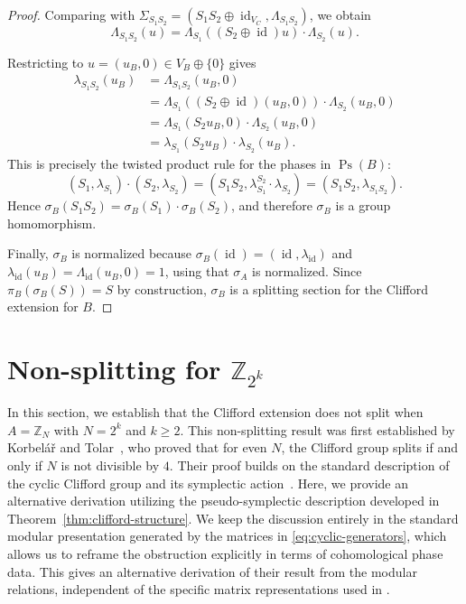 \documentclass[11pt, reqno]{amsart}
\theoremstyle{definition}
\theoremstyle{remark}
\newcommand{\Z}{\mathbb{Z}}
\DeclareMathOperator{\Ps}{Ps}
\DeclareMathOperator{\id}{id}
\begin{document}
\begin{proof}
Comparing with $\Sigma_{S_1 S_2} = (S_1 S_2 \oplus \id_{V_C}, \Lambda_{S_1 S_2})$, we obtain
\begin{equation}
\Lambda_{S_1 S_2}(u) = \Lambda_{S_1}((S_2 \oplus \id)u) \cdot \Lambda_{S_2}(u).
\end{equation}

Restricting to $u = (u_B, 0) \in V_B \oplus \{0\}$ gives
\begin{align}
\lambda_{S_1 S_2}(u_B) &= \Lambda_{S_1 S_2}(u_B, 0) \nonumber \\
&= \Lambda_{S_1}((S_2 \oplus \id)(u_B, 0)) \cdot \Lambda_{S_2}(u_B, 0) \nonumber \\
&= \Lambda_{S_1}(S_2 u_B, 0) \cdot \Lambda_{S_2}(u_B, 0) \nonumber \\
&= \lambda_{S_1}(S_2 u_B) \cdot \lambda_{S_2}(u_B).
\end{align}
This is precisely the twisted product rule for the phases in $\Ps(B)$:
\begin{equation}
(S_1, \lambda_{S_1}) \cdot (S_2, \lambda_{S_2}) = (S_1 S_2, \lambda_{S_1}^{S_2} \cdot \lambda_{S_2}) = (S_1 S_2, \lambda_{S_1 S_2}).
\end{equation}
Hence $\sigma_B(S_1 S_2) = \sigma_B(S_1) \cdot \sigma_B(S_2)$, and therefore $\sigma_B$ is a group homomorphism.

Finally, $\sigma_B$ is normalized because $\sigma_B(\id) = (\id, \lambda_{\id})$ and $\lambda_{\id}(u_B) = \Lambda_{\id}(u_B, 0) = 1$, using that $\sigma_A$ is normalized. Since $\pi_B(\sigma_B(S)) = S$ by construction, $\sigma_B$ is a splitting section for the Clifford extension for $B$.
\end{proof}

\section{Non-splitting for \texorpdfstring{$\Z_{2^k}$}{Z\_2\^k}}\label{sec:nonsplit-cyclic}

In this section, we establish that the Clifford extension does not split when $A = \Z_N$ with $N = 2^k$ and $k \geq 2$. This non-splitting result was first established by Korbel\'a\v{r} and Tolar~\cite{KT23}, who proved that for even $N$, the Clifford group splits if and only if $N$ is not divisible by $4$. Their proof builds on the standard description of the cyclic Clifford group and its symplectic action~\cite{Appleby2005}. Here, we provide an alternative derivation utilizing the pseudo-symplectic description developed in Theorem~\ref{thm:clifford-structure}. We keep the discussion entirely in the standard modular presentation generated by the matrices in \eqref{eq:cyclic-generators}, which allows us to reframe the obstruction explicitly in terms of cohomological phase data. This gives an alternative derivation of their result from the modular relations, independent of the specific matrix representations used in \cite{KT23}.
\end{document}
